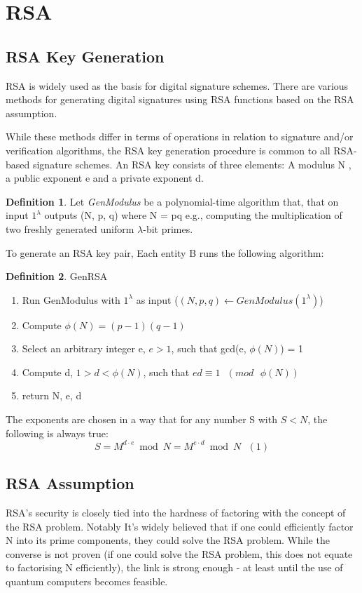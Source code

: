 \documentclass[]{final_report}
\theoremstyle{definition}
\newtheorem{definition}{Definition}[chapter]
\begin{document}
\section{RSA}
\subsection{RSA Key Generation}
\label{subSec:keygen}
RSA is widely used as the basis for digital signature schemes. There are various methods for generating digital signatures using RSA functions based on the RSA assumption. 

While these methods differ in terms of operations in relation to signature and/or verification algorithms, the RSA key generation procedure is common to all RSA-based signature schemes.  An RSA key consists of three elements: A modulus N , a public exponent e and a private exponent d.

\begin{definition}
Let \textit{GenModulus} be a polynomial-time algorithm that, that on input $1^\lambda$ outputs (N, p, q) where N = pq e.g.,  computing the multiplication of two freshly generated uniform $\lambda$-bit primes.
\end{definition}


To generate an RSA key pair, Each entity B runs the following algorithm:

\begin{definition} GenRSA
\label{def:GenRSA}
\begin{mdframed}
\begin{enumerate}
    \item Run GenModulus with $1^\lambda$ as input ($(N, p, q) \leftarrow GenModulus(1^\lambda)$)
    \item Compute $\phi(N) = (p - 1)(q - 1)$
    \item Select an arbitrary integer e, $e > 1$, such that gcd(e, $\phi(N)$) = 1 
    \item Compute d, $1 > d < \phi(N)$, such that $ed \equiv 1 \text{ } (mod \text{ } \phi(N))$
    \item return N, e, d
\end{enumerate}
\end{mdframed}
\end{definition}

The exponents are chosen in a way that for any number S with $S < N$, the following is always true:
\[S = M^{d \cdot e} \bmod N = M^{e \cdot d} \bmod N \text{ } (1)\]

\subsection{RSA Assumption}
\label{subSec:RSA-ASS}
RSA's security is closely tied into the hardness of factoring with the concept of the RSA problem. Notably It's widely believed that if one could efficiently factor N into its prime components, they could solve the RSA problem. While the converse is not proven (if one could solve the RSA problem, this does not equate to factorising N efficiently), the link is strong enough - at least until the use of quantum computers becomes feasible.
\end{document}
